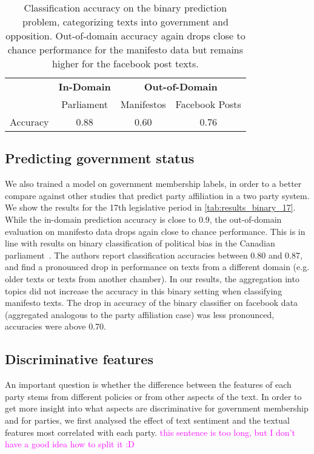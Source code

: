 \documentclass[11pt]{article}
\newcommand{\ssc}[1]{\textcolor{magenta}{#1}}
\begin{document}
\begin{table*}[t]
\caption{
\label{tab:results_binary_17}
Classification accuracy on the binary prediction problem, categorizing texts into government and opposition. Out-of-domain accuracy again drops close to chance performance for the manifesto data but remains higher for the facebook post texts. 
}
\begin{center}
\begin{tabular}{lccc}
& {\bf In-Domain} & \multicolumn{2}{c}{{\bf Out-of-Domain}}\\
& Parliament & Manifestos & Facebook Posts\\
\hline
Accuracy    &   0.88   &   0.60&      0.76\\
%
\end{tabular}
\end{center}
\end{table*}

\subsection{Predicting government status}\label{sec:sentiment_result}
We also trained a model on government membership labels, in order to a better compare against other studies that predict party affiliation in a two party system. We show the results for the 17th legislative period in \autoref{tab:results_binary_17}. While the in-domain prediction accuracy is close to 0.9, the out-of-domain evaluation on manifesto data drops again close to chance performance. This is in line with results on binary classification of political bias in the Canadian parliament~\cite{Yu2008}. The authors report classification accuracies between 0.80 and 0.87, and find a pronounced drop in performance on texts from a different domain (e.g. older texts or texts from another chamber). In our results, the aggregation into topics did not increase the accuracy in this binary setting when classifying manifesto texts. The drop in accuracy of the binary classifier on facebook data (aggregated analogous to the party affiliation case) was less pronounced, accuracies were above 0.70. 

\subsection{Discriminative features}
\label{sec:discrim_effect}
An important question is whether the difference between the features of each party stems from different policies or from other aspects of the text. In order to get more insight into what aspects are discriminative for government membership and for parties, we first analysed the effect of text sentiment and the textual features most correlated with each party. \ssc{this sentence is too long, but I don't have a good idea how to split it :D}
\end{document}
